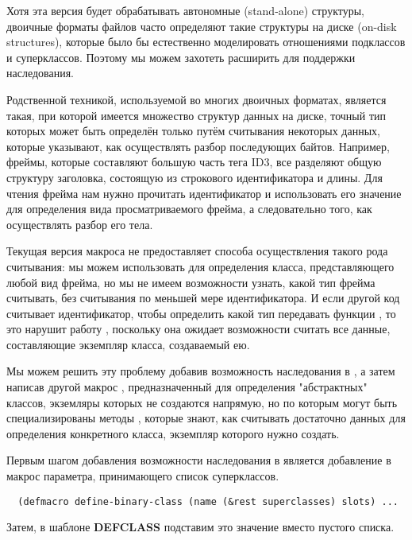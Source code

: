 Хотя эта версия  будет обрабатывать автономные (stand-alone)
структуры, двоичные форматы файлов часто определяют такие структуры на диске (on-disk
structures), которые было бы естественно моделировать отношениями подклассов и
суперклассов. Поэтому мы можем захотеть расширить  для поддержки
наследования.

Родственной техникой, используемой во многих двоичных форматах, является такая, при
которой имеется множество структур данных на диске, точный тип которых может быть
определён только путём считывания некоторых данных, которые указывают, как осуществлять
разбор последующих байтов. Например, фреймы, которые составляют большую часть тега ID3,
все разделяют общую структуру заголовка, состоящую из строкового идентификатора и
длины. Для чтения фрейма нам нужно прочитать идентификатор и использовать его значение для
определения вида просматриваемого фрейма, а следовательно того, как осуществлять разбор
его тела.

Текущая версия макроса  не предоставляет способа осуществления
такого рода считывания: мы можем использовать  для определения
класса, представляющего любой вид фрейма, но мы не имеем возможности узнать, какой тип
фрейма считывать, без считывания по меньшей мере идентификатора. И если другой код
считывает идентификатор, чтобы определить какой тип передавать функции ,
то это нарушит работу , поскольку она ожидает возможности считать все
данные, составляющие экземпляр класса, создаваемый ею.

Мы можем решить эту проблему добавив возможность наследования в
, а затем написав другой макрос
, предназначенный для определения "абстрактных" классов,
экземляры которых не создаются напрямую, но по которым могут быть специализированы методы
, которые знают, как считывать достаточно данных для определения
конкретного класса, экземпляр которого нужно создать.

Первым шагом добавления возможности наследования в  является
добавление в макрос параметра, принимающего список суперклассов.

\begin{lstlisting}
  (defmacro define-binary-class (name (&rest superclasses) slots) ...
\end{lstlisting}

Затем, в шаблоне \textbf{DEFCLASS} подставим это значение вместо пустого списка.

